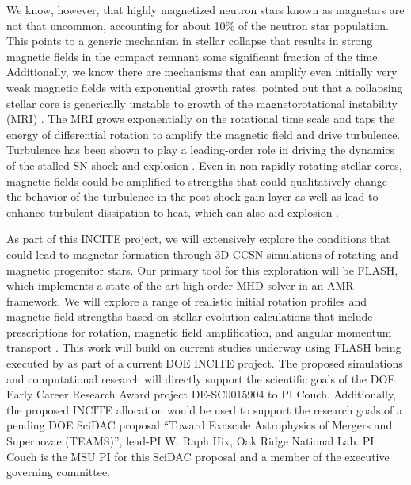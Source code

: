 We know, however, that highly magnetized neutron stars known as
magnetars are not that uncommon, accounting for about 10\% of the
neutron star population.  This points to a generic mechanism in
stellar collapse that results in strong magnetic fields in the compact
remnant some significant fraction of the time.  Additionally, we know
there are mechanisms that can amplify even initially very weak
magnetic fields with exponential growth rates.  \citet{Akiyama:2003}
pointed out that a collapsing stellar core is generically unstable to
growth of the magnetorotational instability (MRI)
\citep{Chandrasekhar:1961, Balbus:1991}.  The MRI grows exponentially
on the rotational time scale and taps the energy of differential
rotation to amplify the magnetic field and drive turbulence.
Turbulence has been shown to play a leading-order role in driving the
dynamics of the stalled SN shock and explosion
\citep{Burrows:1996, Murphy:2013, Couch:2013b, Couch:2015}.  Even in
non-rapidly rotating stellar cores, magnetic fields could be amplified
to strengths that could qualitatively change the behavior of the
turbulence in the post-shock gain layer as well as lead to enhance
turbulent dissipation to heat, which can also aid explosion
\citep[e.g.,][]{Thompson:2005, Ott:2006}.


As part of this INCITE project, we will extensively explore the conditions that could lead to magnetar formation through 3D CCSN simulations of rotating and magnetic progenitor stars.
Our primary tool for this exploration will be FLASH, which implements a state-of-the-art high-order MHD solver in an AMR framework.
We will explore a range of realistic initial rotation profiles and magnetic field strengths based on stellar evolution calculations that include prescriptions for rotation, magnetic field amplification, and angular momentum transport \citep[e.g.,][]{Heger:2005, Paxton:2013, Paxton:2015}.
This work will build on current studies underway using FLASH being executed by as part of a current DOE INCITE project.
The proposed simulations and computational research will directly support the scientific goals of the DOE Early Career Research Award project DE-SC0015904 to PI Couch.
Additionally, the proposed INCITE allocation would be used to support the research goals of a pending DOE SciDAC proposal ``Toward Exascale Astrophysics of Mergers and Supernovae (TEAMS)'', lead-PI W. Raph Hix, Oak Ridge National Lab.
PI Couch is the MSU PI for this SciDAC proposal and a member of the executive governing committee.

